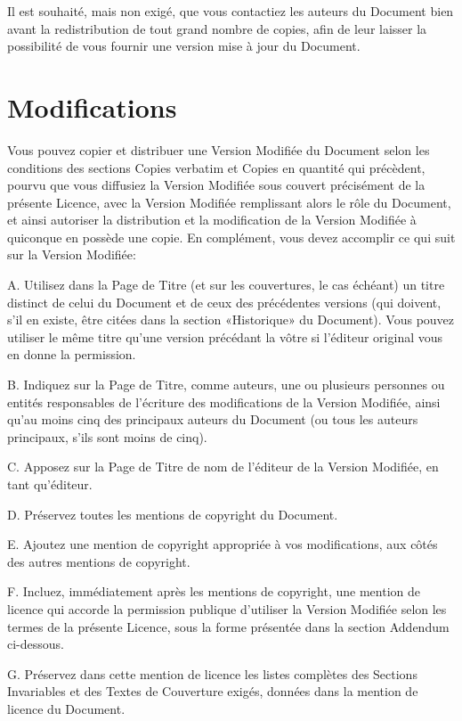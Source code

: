 Il est souhaité, mais non exigé, que vous contactiez les
auteurs du Document bien avant la redistribution de tout grand nombre
de copies, afin de leur laisser la possibilité de vous fournir une
version mise à jour du Document. 


\section{Modifications} 

Vous pouvez copier et distribuer une Version Modifiée du
Document selon les conditions des sections Copies verbatim et Copies
en quantité qui précèdent, pourvu que vous diffusiez la Version Modifiée
sous couvert précisément de la présente Licence, avec la Version Modifiée
remplissant alors le rôle du Document, et ainsi autoriser la distribution
et la modification de la Version Modifiée à quiconque en possède une
copie. En complément, vous devez accomplir ce qui suit sur la Version
Modifiée: 

A. Utilisez dans la Page de Titre (et sur les couvertures,
le cas échéant) un titre distinct de celui du Document et de ceux
des précédentes versions (qui doivent, s'il en existe, être citées
dans la section «Historique» du Document). Vous pouvez utiliser le
même titre qu'une version précédant la vôtre si l'éditeur original
vous en donne la permission. 

B. Indiquez sur la Page de Titre, comme auteurs, une ou
plusieurs personnes ou entités responsables de l'écriture des modifications
de la Version Modifiée, ainsi qu'au moins cinq des principaux auteurs
du Document (ou tous les auteurs principaux, s'ils sont moins de cinq). 

C. Apposez sur la Page de Titre de nom de l'éditeur de la
Version Modifiée, en tant qu'éditeur. 

D. Préservez toutes les mentions de copyright du Document. 

E. Ajoutez une mention de copyright appropriée à vos modifications,
aux côtés des autres mentions de copyright. 

F. Incluez, immédiatement après les mentions de copyright,
une mention de licence qui accorde la permission publique d'utiliser
la Version Modifiée selon les termes de la présente Licence, sous
la forme présentée dans la section Addendum ci-dessous. 

G. Préservez dans cette mention de licence les listes complètes
des Sections Invariables et des Textes de Couverture exigés, données
dans la mention de licence du Document. 


